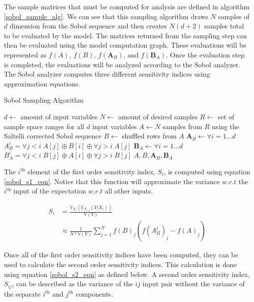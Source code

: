 The sample matrices that must be computed for analysis are defined in algorithm \ref{sobol_sample_alg}. We can see that this sampling algorithm draws $N$ samples of $d$ dimension from the Sobol sequence and then creates $N(d+2)$ samples total to be evaluated by the model. The matrices returned from the sampling step can then be evaluated using the model computation graph. These evaluations will be represented as $f(A) \text{, } f(B) \text{, } f(\textbf{A}_{B}) \text{, and } f(\textbf{B}_{A})$. Once the evaluation step is completed, the evaluations will be analyzed according to the Sobol analyzer. The Sobol analyzer computes three different sensitivity indices using approximation equations.

\begin{algorithm}
  \caption{Sobol Sampling Algorithm}
  \label{sobol_sample_alg}
  \begin{algorithmic}[1]
    \Require $d \gets $ amount of input variables
    \Require $N \gets $ amount of desired samples
    \Require $R \gets $ set of sample space ranges for all $d$ input variables
    \State $A \gets N$ samples from $R$ using the Saltelli corrected Sobol sequence
    \State $B \gets $ shuffled rows from $A$
    \State $\textbf{A}_{B} \gets \forall i = 1 \ldots d$ $A_{B}^i = \forall j < i \; A[j] \oplus B[i] \oplus \forall j > i \; A[j]$
    \State $\textbf{B}_{A} \gets \forall i = 1 \ldots d$ $B_{A}^i = \forall j < i \; B[j] \oplus A[i] \oplus \forall j > i \; B[j]$
    \State \Return $A, B, \textbf{A}_{B}, \textbf{B}_{A}$
  \end{algorithmic}
\end{algorithm}

The $i^{\text{th}}$ element of the first order sensitivity index, $S_i$, is computed using equation \ref{sobol_s1_eqn}. Notice that this function will approximate the variance $w.r.t$ the $i^{\text{th}}$ input of the expectation $w.r.t$ all other inputs.

\begin{equation} \label{sobol_s1_eqn}
  \begin{split}
    S_i & = \frac{\mathbb{V}_{X_i}\left(\mathbb{E}_{X_{\sim i}}(Y | X_i) \right)}{\mathbb{V}(Y)} \\
     & \approx \frac{1}{N * \mathbb{V}(Y)} \sum_{j=1}^{N} f(B)_j\left( f(A_{B}^{i})_j - f(A)_j\right)
  \end{split}
\end{equation}

Once all of the first order sensitivity indices have been computed, they can be used to calculate the second order sensitivity indices. This calculation is done using equation \ref{sobol_s2_eqn} as defined below. A second order sensitivity index, $S_{ij}$, can be described as the variance of the $ij$ input pair without the variance of the separate $i^{\text{th}}$ and $j^{\text{th}}$ components.

